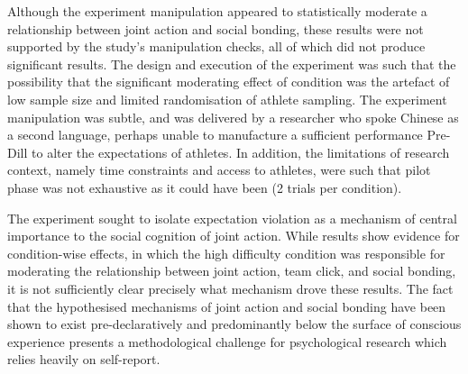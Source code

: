 Although the experiment manipulation appeared to statistically moderate a relationship between joint action and social bonding, these results were not supported by the study's manipulation checks, all of which did not produce significant results.  The design and execution of the experiment was such that the possibility that the significant moderating effect of condition was the artefact of low sample size and limited randomisation of athlete sampling. The experiment manipulation was subtle, and was delivered by a researcher who spoke Chinese as a second language, perhaps unable to manufacture a sufficient performance Pre-Dill to alter the expectations of athletes. In addition, the limitations of research context, namely time constraints and access to athletes, were such that pilot phase was not exhaustive as it could have been (2 trials per condition).

The experiment sought to isolate expectation violation as a mechanism of central importance to the social cognition of joint action.  While results show evidence for condition-wise effects, in which the high difficulty condition was responsible for moderating the relationship between joint action, team click, and social bonding, it is not sufficiently clear precisely what mechanism drove these results.
The fact that the hypothesised mechanisms of joint action and social bonding have been shown to exist pre-declaratively and predominantly below the surface of conscious experience presents a methodological challenge for psychological research which relies heavily on self-report.




